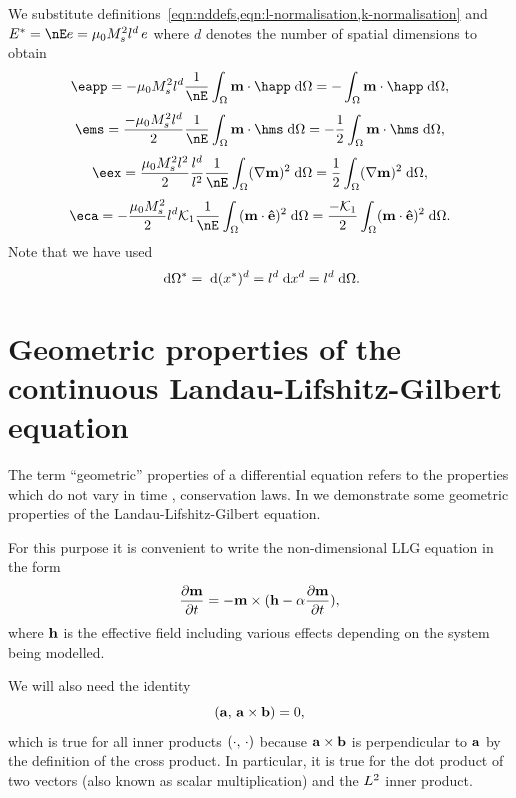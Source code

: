We substitute definitions~\cref{eqn:nddefs,eqn:l-normalisation,k-normalisation} and $E^* = \nE e = \mu_0 M_s^2 l^d \, e$ where $d$ denotes the number of spatial dimensions to obtain
\begin{equation}
  \eapp = -\mu_0 M_s^2 l^d \frac{1}{\nE} \int_{\magd} \mv \cdot \happ \d \magd
  = - \int_{\magd} \mv \cdot \happ \d \magd,
  \label{eq:nd-e-app}
\end{equation}
\begin{equation}
  \ems = \frac{-\mu_0 M_s^2 l^d}{2} \frac{1}{\nE} \int_{\magd} \mv \cdot \hms \d \magd
  = -\frac{1}{2} \int_{\magd} \mv \cdot \hms \d \magd,
  \label{eq:nd-e-ms}
\end{equation}
\begin{equation}
  \eex =  \frac{\mu_0 M_s^2 l^2}{2} \frac{l^d}{l^2} \frac{1}{\nE} \int_{\magd} (\grad \mv)^2 \d \magd
  = \frac{1}{2} \int_{\magd} (\grad \mv)^2 \d \magd,
  \label{eq:nd-e-ex}
\end{equation}
\begin{equation}
  \eca = - \frac{\mu_0 M_s^2}{2 } l^d \kone \frac{1}{\nE} \int_\magd (\mv \cdot \ev)^2 \d \magd
  = \frac{-\kone}{2} \int_\magd (\mv \cdot \ev)^2 \d \magd.
  \label{eq:nd-e-ca}
\end{equation}
Note that we have used
\begin{equation}
  {\; \mathrm{{d}}} \Omega^* = {\; \mathrm{{d}}} (x^*)^d = l^d {\; \mathrm{{d}}} x^d = l^d {\; \mathrm{{d}}} \Omega.
\end{equation}


\section{Geometric properties of the continuous Landau-Lifshitz-Gilbert equation}
\label{sec:prop-cont-llg}

The term ``geometric'' properties of a differential equation refers to the properties which do not vary in time \cite[73]{Iserles2009}, \ie conservation laws.
In  we demonstrate some geometric properties of the Landau-Lifshitz-Gilbert equation.

For this purpose it is convenient to write the non-dimensional LLG equation in the form
\begin{equation}
  \label{eq:llg-prop-form}
  \frac{\partial \boldsymbol{\mathrm{m}}}{\partial t} = - \boldsymbol{\mathrm{m}} \times( \boldsymbol{\mathrm{h}} - \alpha \frac{\partial \boldsymbol{\mathrm{m}}}{\partial t}),
\end{equation}
where $\boldsymbol{\mathrm{h}}$ is the effective field including various effects depending on the system being modelled.

We will also need the identity
\begin{equation}
  \label{eq:dot-cross-id}
  \left({\boldsymbol{\mathrm{a}}},\, {\boldsymbol{\mathrm{a}}} \times {\boldsymbol{\mathrm{b}}} \right) = 0,
\end{equation}
which is true for all inner products $\left(\cdot,\, \cdot \right)$ because ${\boldsymbol{\mathrm{a}}} \times {\boldsymbol{\mathrm{b}}}$ is perpendicular to ${\boldsymbol{\mathrm{a}}}$ by the definition of the cross product.
In particular, it is true for the dot product of two vectors (also known as scalar multiplication) and the ${L^2}$ inner product.

